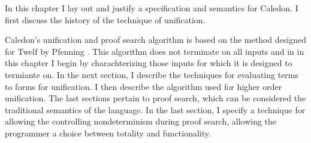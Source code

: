 In this chapter I lay out and justify a specification and semantics 
for Caledon.  I first discuss the history of the technique of unification.

Caledon's unification and proof search algorithm is based on the method designed for Twelf by Pfenning
\citep{pfenning1991logic}.  This algorithm does not terminate on all inputs and in in this chapter 
I begin by charachterizing those inputs for which it is designed to termiante on.  In the next section, I describe
the techniques for evaluating terms to forms for unification.  I then describe the algorithm
used for higher order unification.  
The last sections pertain to proof search, which can be considered the traditional semantics of the language.
In the last section, I specify a technique for allowing the controlling nondeterminism during proof search, 
allowing the programmer a choice between totality and functionality.


